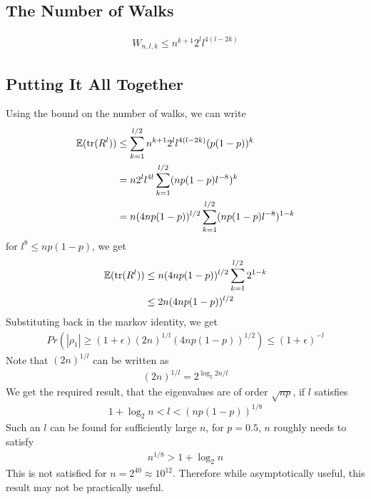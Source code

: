 \documentclass{math}
\newcommand{\expect}{\mathbb{E}}
\newcommand{\prob}{Pr}
\begin{document}
\subsection{The Number of Walks}

\begin{lemma}
    \begin{align*}
        W_{n, l, k} \leq n^{k + 1}2^ll^{4(l - 2k)}
    \end{align*}
\end{lemma}

\subsection{Putting It All Together}

Using the bound on the number of walks, we can write
\begin{align*}
    \expect(\trace(R^l)) & \leq \sum_{k=1}^{l/2} n^{k + 1}2^ll^{4(l - 2k)} (p(1-p))^k  \\
                         & = n 2^l l^{4l} \sum_{k=1}^{l/2} (np(1-p)l^{-8})^k           \\
                         & = n (4np(1-p))^{l/2} \sum_{k=1}^{l/2} (np(1-p)l^{-8})^{1-k}
\end{align*}
for $l^8 \leq np(1-p)$, we get
\begin{align*}
    \expect(\trace(R^l)) & \leq n (4np(1-p))^{l/2} \sum_{k=1}^{l/2} 2^{1-k} \\
                         & \leq 2n(4np(1-p))^{l/2}
\end{align*}
Substituting back in the markov identity, we get
\begin{align*}
    \prob(|\rho_1| \geq (1 + \epsilon) (2n)^{1/l}(4np(1-p))^{1/2}) \leq (1 + \epsilon)^{-l}
\end{align*}
Note that $(2n)^{1/l}$ can be written as
\begin{align*}
    (2n)^{1/l} = 2^{\log_2{2n}/l}
\end{align*}
We get the required result, that the eigenvalues are of order $\sqrt{np}$, if $l$ satisfies
\begin{align*}
    1 + \log_2{n} < l < (np(1-p))^{1/8}
\end{align*}
Such an $l$ can be found for sufficiently large $n$, for $p = 0.5$, $n$ roughly needs to satisfy
\begin{align*}
    n^{1/8} > 1 + \log_2 n
\end{align*}
This is not satisfied for $n = 2^{40} \approx 10^{12}$.
Therefore while asymptotically useful, this result may not be practically useful.
\end{document}
